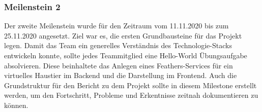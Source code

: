 \documentclass[10pt, a4paper]{article}
\begin{document}
\subsubsection*{Meilenstein 2}
Der zweite Meilenstein wurde für den Zeitraum vom 11.11.2020 bis zum 25.11.2020 angesetzt.
Ziel war es, die ersten Grundbausteine für das Projekt legen. Damit das Team ein generelles Verständnis des Technologie-Stacks entwickeln konnte,
sollte jedes Teammitglied eine \glqq Hello-World\grqq{} Übungsaufgabe absolvieren. Diese beinhaltete das Anlegen eines Feathers-Services für ein virtuelles
Haustier im Backend und die Darstellung im Frontend. Auch die Grundstruktur für den Bericht zu dem Projekt sollte in diesem Milestone erstellt werden,
um den Fortschritt, Probleme und Erkentnisse zeitnah dokumentieren zu können.
\\~\\
\end{document}
